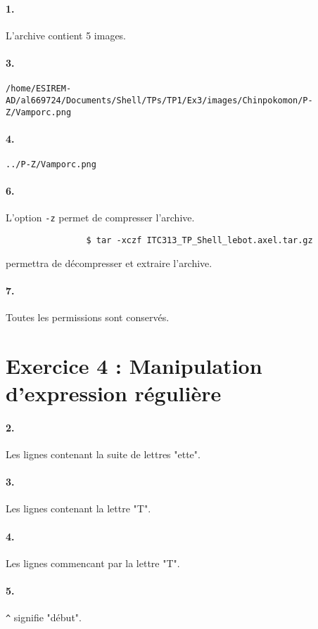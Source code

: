         \paragraph{1.}
            L'archive contient 5 images.
        \paragraph{3.}
            \texttt{/home/ESIREM-AD/al669724/Documents/Shell/TPs/TP1/Ex3/images/Chinpokomon/P-Z/Vamporc.png}
        \paragraph{4.}
            \texttt{../P-Z/Vamporc.png}
        \paragraph{6.}
            L'option \texttt{-z} permet de compresser l'archive.
            \begin{verbatim}
                $ tar -xczf ITC313_TP_Shell_lebot.axel.tar.gz
            \end{verbatim}
            permettra de décompresser et extraire l'archive.
        \paragraph{7.}
            Toutes les permissions sont conservés.
    \section{Exercice 4 : Manipulation d'expression régulière}
        \paragraph{2.}
            Les lignes contenant la suite de lettres "ette".
        \paragraph{3.}
            Les lignes contenant la lettre "T".
        \paragraph{4.}
            Les lignes commencant par la lettre "T".
        \paragraph{5.}
            \texttt{\^} signifie "début".
